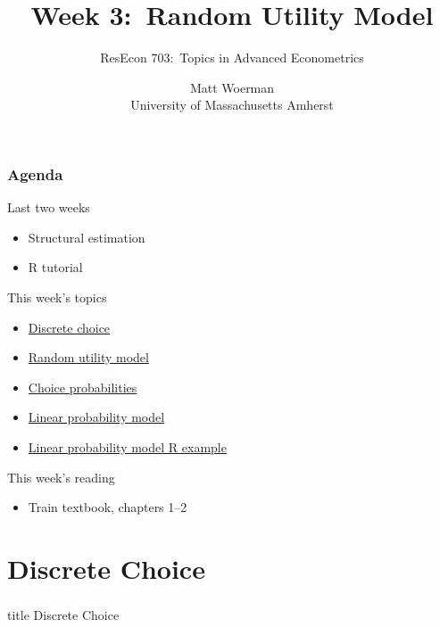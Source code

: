 \documentclass{beamer}\usepackage[]{graphicx}\usepackage[]{xcolor}
\title[Week 3:\ Random Utility Model]{Week 3:\ Random Utility Model}
\author[ResEcon 703:\ Advanced Econometrics]{ResEcon 703:\ Topics in Advanced Econometrics}
\date{Matt Woerman\\University of Massachusetts Amherst}
\begin{document}
{ 
\begin{frame}[noframenumbering]
    \titlepage
\end{frame}
}

\begin{frame}\frametitle{Agenda}
    Last two weeks
    \begin{itemize}
    	\item Structural estimation
      \item R tutorial
    \end{itemize}
    \vspace{2ex}
    This week's topics
    \begin{itemize}
    	\item \hyperlink{page.\getpagerefnumber{dc}}{Discrete choice}
        \item \hyperlink{page.\getpagerefnumber{rum}}{Random utility model}
        \item \hyperlink{page.\getpagerefnumber{probabilities}}{Choice probabilities}
        \item \hyperlink{page.\getpagerefnumber{lpm}}{Linear probability model}
        \item \hyperlink{page.\getpagerefnumber{example}}{Linear probability model R example}
    \end{itemize}
    \vspace{2ex}
    This week's reading
    \begin{itemize}
        \item Train textbook, chapters 1--2
    \end{itemize}
\end{frame}

\section{Discrete Choice}
\label{dc}
\begin{frame}\frametitle{}
    \vfill
    \centering
    \begin{beamercolorbox}[center]{title}
        \Large Discrete Choice
    \end{beamercolorbox}
    \vfill
\end{frame}
\end{document}
